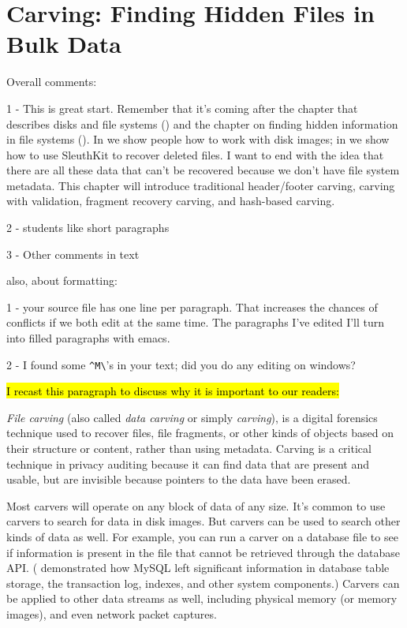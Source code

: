 \chapter{Carving: Finding Hidden Files in Bulk Data}

\color{red} 
Overall comments:

1 - This is great start. Remember that it's coming after the chapter
that describes disks and file systems () and the
chapter on finding hidden information in file systems
(). In  we show people how to
work with disk images; in  we show how to use
SleuthKit to recover deleted files. I want  to
end with the idea that there are all these data that can't be
recovered because we don't have file system metadata. This chapter
will introduce traditional header/footer carving, carving with
validation, fragment recovery carving, and hash-based carving.

2 - students like short paragraphs

3 - Other comments in text

also, about formatting:

1 - your source file has one line per paragraph. That increases the
chances of conflicts if we both edit at the same time. The paragraphs
I've edited I'll turn into filled paragraphs with emacs. 

2 - I found some \verb+^M\+'s in your text; did you do any editing on windows?

\color{black}


\hl{I recast this paragraph to discuss why it is important to our
  readers:}

\emph{File carving} (also called \emph{data carving} or simply
\emph{carving}), is a digital forensics technique used to recover
files, file fragments, or other kinds of objects based on their
structure or content, rather than using metadata. Carving is a
critical technique in privacy auditing because it can find data that
are present and usable, but are invisible because pointers to the
data have been erased.

Most carvers will operate on any block of data of any size. It's
common to use carvers to search for data in disk images. But carvers
can be used to search other kinds of data as well. For example, you
can run a carver on a database file to see if information is present
in the file that cannot be retrieved through the database API.
( demonstrated how MySQL left significant information
in database table storage, the transaction log, indexes, and other
system components.) Carvers can be applied to other data
streams as well, including physical memory (or memory images), and
even network packet captures. 

